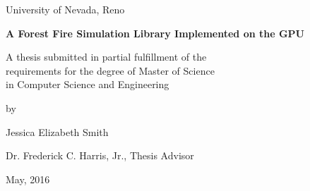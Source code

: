 \setcounter{page}{0}
\thispagestyle{empty}

\begin{center}
University of Nevada, Reno

\vfill


{\Large \bf A Forest Fire Simulation Library Implemented on the GPU
\\ \vspace{0.05in}}
\vfill

A thesis submitted in partial fulfillment of the\\
requirements for the degree of Master of Science\\
in Computer Science and Engineering

\vfill

by

\vspace{0.5in}

Jessica Elizabeth Smith

\vspace{0.5in}

Dr. Frederick C. Harris, Jr., Thesis Advisor

\vspace{0.5in}

May, 2016
\end{center}
